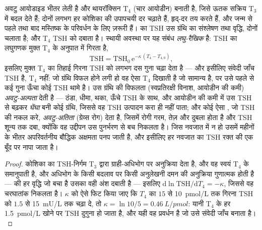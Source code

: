 \begin{proposition}\label{prop:b3:endocrinology:thyroid}
अवटु आयोडाइड भीतर लेती है और थायरॉक्सिन T$_{4}$ (चार आयोडीन) बनाती है,
जिसे ऊतक सक्रिय T$_{3}$ में बदल देते हैं; दोनों लगभग हर कोशिका की
उपापचयी दर चढ़ाते हैं, हृद्-दर तय करते हैं, और जन्म से पहले तथा बाद
मस्तिष्क के परिवर्धन के लिए ज़रूरी हैं।  का TSH उस ग्रंथि का
संश्लेषण तथा वृद्धि, दोनों चलाता है; और T$_{4}$
TSH को दबाता है। स्थायी अवस्था पर यह संबंध \emph{लघु-रैखिक} है: TSH का
लघुगणक मुक्त T$_{4}$ के अनुपात में गिरता है,
\[
\text{TSH} = \text{TSH}_{0}\,\mathrm{e}^{-\kappa\,(T_{4} - T_{4,0})},
\]
इसलिए मुक्त T$_{4}$ का तिहाई गिरना TSH को लगभग दस गुना चढ़ा देता है ---
और इसीलिए संवेदी जाँच TSH है, T$_{4}$ नहीं: जो ग्रंथि विफल होने लगी हो
वह ऐसा T$_{4}$ दिखाती है जो सामान्य है, पर उसे पहले से कई गुना ऊँचा
कोई TSH थामे है। उस ग्रंथि की विफलता (स्वप्रतिरक्षी विनाश, आयोडीन की
कमी) \emph{अवटु-अल्पता} देती है --- ठंडा, धीमा, थका, ऊँचे TSH के साथ,
और आयोडीन की कमी में उस TSH से बढ़कर \emph{घेंघा} बनी कोई ग्रंथि, जिससे
वह TSH उत्पादन करा ही नहीं पाता; और कोई ऐसा , जो TSH की नकल
करे, \emph{अवटु-अतिता} (ग्रेव्स रोग) देता है, जिसमें रोगी गरम, तेज़ और
दुबला होता है और TSH शून्य तक दबा, क्योंकि वह उद्दीपन उस पुनर्भरण से
बच निकलता है। जिस नवजात में  न हो उसमें महीनों के भीतर
अपरिवर्तनीय बौद्धिक अक्षमता पनप जाती है, और इसीलिए हर नवजात का TSH रक्त
की एक बूँद पर नापा जाता है।
\end{proposition}
\begin{proof}
 कोशिका का TSH-निर्गम T$_{3}$ द्वारा ग्राही-अधिभोग पर अनुक्रिया
देता है, और वह स्वयं T$_{4}$ के समानुपाती है, और अधिभोग के किसी बदलाव
पर किसी अनुलेखनी दमन की अनुक्रिया गुणात्मक होती है ---  की हर
वृद्धि जो बचा है उसका वही अंश दबाती है --- इसलिए
$\mathrm{d}\ln\text{TSH}/\mathrm{d}T_{4} = -\kappa$, जिससे वह चरघातांक
निकलता है। $\kappa$ को ऐसे फिट किया जाए कि $T_{4}$ का $15$ से
\qty{10}{pmol/L} तक गिरना TSH को $1.5$ से \qty{15}{mU/L} तक चढ़ा दे, तो
$\kappa = \ln 10/5 = \qty{0.46}{L/pmol}$: यानी T$_{4}$ के हर
\qty{1.5}{pmol/L} खोने पर TSH दुगुना हो जाता है, और यही वह प्रवर्धन है
जो उसे संवेदी जाँच बनाता है।
\end{proof}

